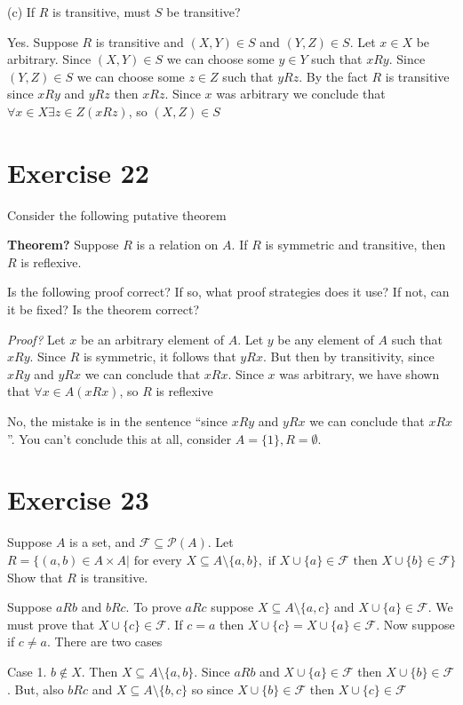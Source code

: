 \documentclass[11pt]{article}
\newcommand{\powerset}[1]{\mathscr{P}(#1)}
\newcommand{\family}[1]{\mathcal{#1}}
\begin{document}
\noindent (c) If $R$ is transitive, must $S$ be transitive?

Yes. Suppose $R$ is transitive and $(X, Y) \in S$ and $(Y, Z) \in S$. Let $x \in X$
be arbitrary. Since $(X, Y) \in S$ we can choose some $y \in Y$ such that $xRy$.
Since $(Y, Z) \in S$ we can choose some $z \in Z$ such that $yRz$. By the fact 
$R$ is transitive since $xRy$ and $yRz$ then $xRz$. Since $x$ was arbitrary we 
conclude that $\forall x \in X \exists z \in Z (xRz)$, so $(X, Z) \in S$

\section*{Exercise 22}

Consider the following putative theorem

\textbf{Theorem?} Suppose $R$ is a relation on $A$. If $R$ is symmetric and 
transitive, then $R$ is reflexive.

Is the following proof correct? If so, what proof strategies does it use?
If not, can it be fixed? Is the theorem correct?

\textit{Proof?} Let $x$ be an arbitrary element of $A$. Let $y$ be any element
of $A$ such that $xRy$. Since $R$ is symmetric, it follows that $yRx$. But then
by transitivity, since $xRy$ and $yRx$ we can conclude that $xRx$. Since $x$ was 
arbitrary, we have shown that $\forall x \in A (xRx)$, so $R$ is reflexive

No, the mistake is in the sentence ``since $xRy$ and $yRx$ we can 
conclude that $xRx$''. You can't conclude this at all, consider 
$A = \{1\}, R = \emptyset$.

\section*{Exercise 23}

Suppose $A$ is a set, and $\family{F} \subseteq \powerset{A}$. Let
$R = \{(a,b) \in A \times A | \text{ for every } X \subseteq A \setminus \{a,b\}, 
\text{ if } X \cup \{a\} \in \family{F} \text{ then } X \cup \{b\} \in \family{F}\}$
Show that $R$ is transitive.

Suppose $aRb$ and $bRc$. To prove $aRc$ suppose $X \subseteq A \setminus \{a, c\}$
and $X \cup \{a\} \in \family{F}$. We must prove that $X \cup \{c\} \in \family{F}$.
If $c = a$ then $X \cup \{c\} = X \cup \{a\} \in \family{F}$. Now suppose if 
$c \neq a$. There are two cases

Case 1. $b \notin X$. Then $X \subseteq A \setminus \{a, b\}$. Since $aRb$
and $X \cup \{a\} \in \family{F}$ then $X \cup \{b\} \in \family{F}$.
But, also $bRc$ and $X \subseteq A \setminus \{b, c\}$ so since 
$X \cup \{b\} \in \family{F}$ then $X \cup \{c\} \in \family{F}$
\end{document}
